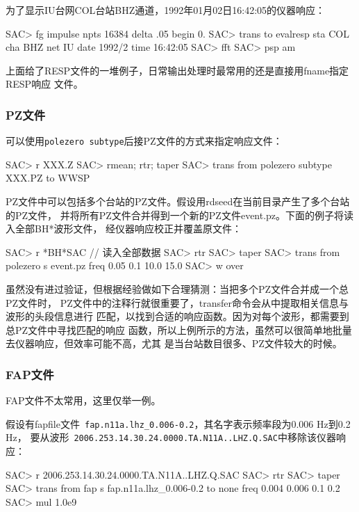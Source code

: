 为了显示IU台网COL台站BHZ通道，1992年01月02日16:42:05的仪器响应：
\begin{SACCode}
SAC> fg impulse npts 16384 delta .05 begin 0.
SAC> trans to evalresp sta COL cha BHZ net IU date 1992/2 time 16:42:05
SAC> fft
SAC> psp am
\end{SACCode}

上面给了RESP文件的一堆例子，日常输出处理时最常用的还是直接用fname指定RESP响应
文件。

\subsubsection{PZ文件}
可以使用\verb+polezero subtype+后接PZ文件的方式来指定响应文件：
\begin{SACCode}
SAC> r XXX.Z
SAC> rmean; rtr; taper
SAC> trans from polezero subtype XXX.PZ to WWSP
\end{SACCode}

PZ文件中可以包括多个台站的PZ文件。假设用rdseed在当前目录产生了多个台站的PZ文件，
并将所有PZ文件合并得到一个新的PZ文件event.pz。下面的例子将读入全部BH*波形文件，
经仪器响应校正并覆盖原文件：
\begin{SACCode}
SAC> r *BH*SAC          // 读入全部数据
SAC> rtr
SAC> taper
SAC> trans from polezero s event.pz freq 0.05 0.1 10.0 15.0
SAC> w over
\end{SACCode}

虽然没有进过验证，但根据经验做如下合理猜测：当把多个PZ文件合并成一个总PZ文件时，
PZ文件中的注释行就很重要了，transfer命令会从中提取相关信息与波形的头段信息进行
匹配，以找到合适的响应函数。因为对每个波形，都需要到总PZ文件中寻找匹配的响应
函数，所以上例所示的方法，虽然可以很简单地批量去仪器响应，但效率可能不高，尤其
是当台站数目很多、PZ文件较大的时候。

\subsubsection{FAP文件}
FAP文件不太常用，这里仅举一例。

假设有fapfile文件~\verb+fap.n11a.lhz_0.006-0.2+，其名字表示频率段为0.006 Hz到0.2 Hz，
要从波形~\verb+2006.253.14.30.24.0000.TA.N11A..LHZ.Q.SAC+中移除该仪器响应：
\begin{SACCode}
SAC> r 2006.253.14.30.24.0000.TA.N11A..LHZ.Q.SAC
SAC> rtr
SAC> taper
SAC> trans from fap s fap.n11a.lhz_0.006-0.2 to none freq 0.004 0.006 0.1 0.2
SAC> mul 1.0e9
\end{SACCode}
